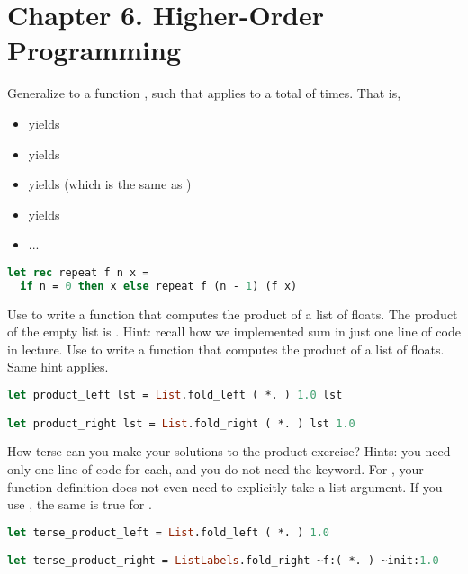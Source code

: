
\section*{Chapter 6. Higher-Order Programming}

\problem[repeat]
Generalize  to a function , such that  applies  to  a total of  times. That is,
\begin{itemize}
  \item {} yields 
  \item {} yields 
  \item {} yields  (which is the same as )
  \item {} yields 
  \item ...
\end{itemize}

\begin{lstlisting}[language=OCaml]
let rec repeat f n x =
  if n = 0 then x else repeat f (n - 1) (f x)
\end{lstlisting}

\problem[product]
Use  to write a function  that computes the product of a list of floats. The product of the empty list is . Hint: recall how we implemented sum in just one line of code in lecture.
Use  to write a function  that computes the product of a list of floats. Same hint applies.

\begin{lstlisting}[language=OCaml]
let product_left lst = List.fold_left ( *. ) 1.0 lst

let product_right lst = List.fold_right ( *. ) lst 1.0
\end{lstlisting}

How terse can you make your solutions to the product exercise? Hints: you need only one line of code for each, and you do not need the  keyword. For , your function definition does not even need to explicitly take a list argument. If you use , the same is true for .

\begin{lstlisting}[language=OCaml]
let terse_product_left = List.fold_left ( *. ) 1.0

let terse_product_right = ListLabels.fold_right ~f:( *. ) ~init:1.0
\end{lstlisting}


